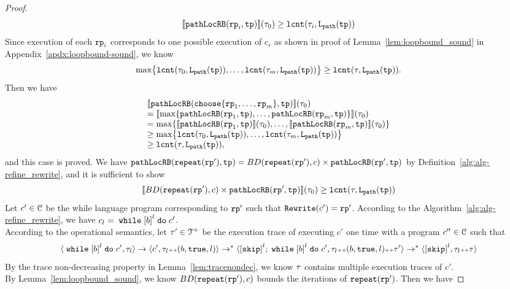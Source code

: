 \begin{proof}
\[
  \llbracket \mathtt{pathLocRB}(\mathtt{rp}_i, \mathtt{tp}) \rrbracket(\mathtt{\tau}_0)  \geq \mathtt{lcnt}(\mathtt{\tau}_i, \mathtt{L}_{\mathtt{path}}(\mathtt{tp})) 
\]
Since execution of each $\mathtt{rp}_i$ corresponds to one possible execution of $c_r$ as shown in proof of Lemma~\ref{lem:loopbound_sound} in Appendix~\ref{apdx:loopbound-sound}, we know
\[
  \max\left\{\lcounter(\trace_0, \pathl(\tpath)), \ldots, \lcounter(\trace_m, \pathl(\tpath)) \right\} 
  \geq \lcounter(\trace, \pathl(\tpath)).
\]
Then we have
\[
  \begin{array}{l}
  \econfig{\outinB(\rpchoose{\rprog_1, \ldots, \rprog_m }, \tpath)}(\trace_0)
  \\
  = \econfig{\max\left\{ \outinB(\rprog_1, \tpath), \ldots, \outinB(\rprog_m, \tpath) \right\}}(\trace_0)
  \\
  = \max\left\{\econfig{\outinB(\rprog_1, \tpath)}(\trace_0), \ldots, \econfig{ \outinB(\rprog_m, \tpath)}(\trace_0) \right\}
  \\
  \geq \max\left\{\lcounter(\trace_0, \pathl(\tpath)), \ldots, \lcounter(\trace_m, \pathl(\tpath)) \right\} 
  \\
  \geq \lcounter(\trace, \pathl(\tpath)),
  \end{array}
\] 
and this case is proved.
We have $\mathtt{pathLocRB}(\mathtt{repeat}(\mathtt{rp}'), \mathtt{tp}) = BD(\mathtt{repeat}(\mathtt{rp}'), c) \times \mathtt{pathLocRB}(\mathtt{rp}', \mathtt{tp})$
by Definition~\ref{alg:alg-refine_rewrite}, and
it is sufficient to show
\[
  \llbracket  BD(\mathtt{repeat}(\mathtt{rp}'), c) \times \mathtt{pathLocRB}(\mathtt{rp}', \mathtt{tp}) \rrbracket (\mathtt{\tau}_0) \geq \mathtt{lcnt}(\mathtt{\tau}, \mathtt{L}_{\mathtt{path}}(\mathtt{tp})) 
\]
Let $c' \in \mathcal{C}$ be the while language program corresponding to $\mathtt{rp}'$ such that $\mathtt{Rewrite}(c') = \mathtt{rp}'$.
According to the Algorithm~\ref{alg:alg-refine_rewrite}, we have $c_l = \ewhile \clabel{\bexpr}^{l} \edo c'$.
\\
According to the operational semantics, let $\mathtt{\tau}' \in \mathcal{T}^{+}$ be the execution trace of executing $c'$ one time with a program $c'' \in \mathcal{C}$ such that 
\[
  \config{\ewhile \clabel{\bexpr}^{l} \edo c', \trace_l} \to \config{c', \trace_l \tracecat (\bexpr, \etrue, l)} \to^* \config{\clabel{\eskip}^{l}; \ewhile \clabel{\bexpr}^{l} \edo c', \trace_l \tracecat (\bexpr, \etrue, l) \tracecat \trace'}
  \to^* \config{\clabel{\eskip}^{l}, \trace_l \tracecat \trace}
\]
By the trace non-decreasing property in Lemma~\ref{lem:tracenondec}, we know $\mathtt{\tau}$ contains multiple execution traces of $c'$.
\\
By Lemma~\ref{lem:loopbound_sound}, we know $BD(\mathtt{repeat}(\mathtt{rp}'), c)$ bounds the iterations of $\mathtt{repeat}(\mathtt{rp}')$. Then we have

\end{proof}
